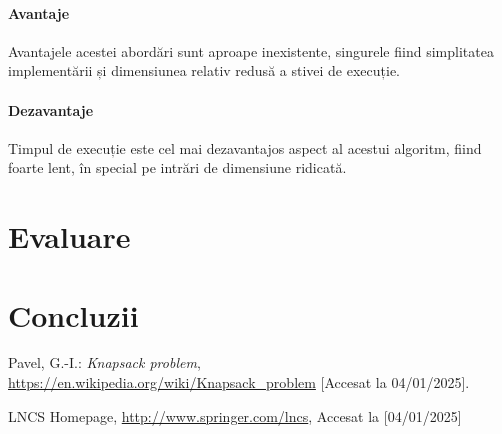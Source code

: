 \documentclass[runningheads]{llncs}
\begin{document}
\paragraph{Avantaje} Avantajele acestei abordări sunt aproape inexistente, singurele fiind
simplitatea implementării și dimensiunea relativ redusă a stivei de execuție.

\paragraph{Dezavantaje} Timpul de execuție este cel mai dezavantajos aspect al acestui algoritm,
fiind foarte lent, în special pe intrări de dimensiune ridicată.

\section{Evaluare}

\section{Concluzii}

%
%
%
% 
% 
%
\begin{thebibliography}{8}
Pavel, G.-I.: \emph{Knapsack problem}, \url{https://en.wikipedia.org/wiki/Knapsack_problem} [Accesat la 04/01/2025].

LNCS Homepage, \url{http://www.springer.com/lncs}, Accesat la [04/01/2025]


\end{thebibliography}
\end{document}
